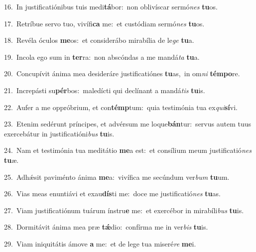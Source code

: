 {\numbfont\textcolor{\numbcolor}{16.}}~In justificatiónibus tuis medi\-\textbf{tá}\-bor:~\star non oblivíscar sermó\textit{nes} \textbf{tu}\-os.\par
{\numbfont\textcolor{\numbcolor}{17.}}~Retríbue servo tuo, vivífi\textbf{ca} me:~\star et custódiam sermó\textit{nes} \textbf{tu}\-os.\par
{\numbfont\textcolor{\numbcolor}{18.}}~Revéla óculos \textbf{me}\-os:~\star et considerábo mirabília de le\textit{ge} \textbf{tu}\-a.\par
{\numbfont\textcolor{\numbcolor}{19.}}~Incola ego sum in \textbf{ter}\-ra:~\star non abscóndas a me mandá\textit{ta} \textbf{tu}\-a.\par
{\numbfont\textcolor{\numbcolor}{20.}}~Concupívit ánima mea desideráre justificatiónes \textbf{tu}\-as,~\star in om\textit{ni} \textbf{tém}\-\textbf{po}re.\par
{\numbfont\textcolor{\numbcolor}{21.}}~Increpásti su\-\textbf{pér}\-bos:~\star maledícti qui declínant a mandá\textit{tis} \textbf{tu}\-is.\par
{\numbfont\textcolor{\numbcolor}{22.}}~Aufer a me oppróbrium, et con\-\textbf{témp}\-tum:~\star quia testimónia tua ex\-\textit{qui}\-\textbf{sí}vi.\par
{\numbfont\textcolor{\numbcolor}{23.}}~Etenim sedérunt príncipes, et advérsum me loque\-\textbf{bán}\-tur:~\star servus autem tuus exercebátur in justificatióni\textit{bus} \textbf{tu}\-is.\par
{\numbfont\textcolor{\numbcolor}{24.}}~Nam et testimónia tua meditátio \textbf{me}\-a est:~\star et consílium meum justificatió\textit{nes} \textbf{tu}\-æ.\par
{\numbfont\textcolor{\numbcolor}{25.}}~Adhǽsit paviménto ánima \textbf{me}\-a:~\star vivífica me secúndum ver\textit{bum} \textbf{tu}\-um.\par
{\numbfont\textcolor{\numbcolor}{26.}}~Vias meas enuntiávi et exau\-\textbf{dís}\-ti me:~\star doce me justificatió\textit{nes} \textbf{tu}\-as.\par
{\numbfont\textcolor{\numbcolor}{27.}}~Viam justificatiónum tuárum ínstru\textbf{e} me:~\star et exercébor in mirabíli\textit{bus} \textbf{tu}\-is.\par
{\numbfont\textcolor{\numbcolor}{28.}}~Dormitávit ánima mea præ \textbf{tǽ}\-dio:~\star confírma me in ver\textit{bis} \textbf{tu}\-is.\par
{\numbfont\textcolor{\numbcolor}{29.}}~Viam iniquitátis ámove \textbf{a} me:~\star et de lege tua miseré\textit{re} \textbf{me}\-i.\par
